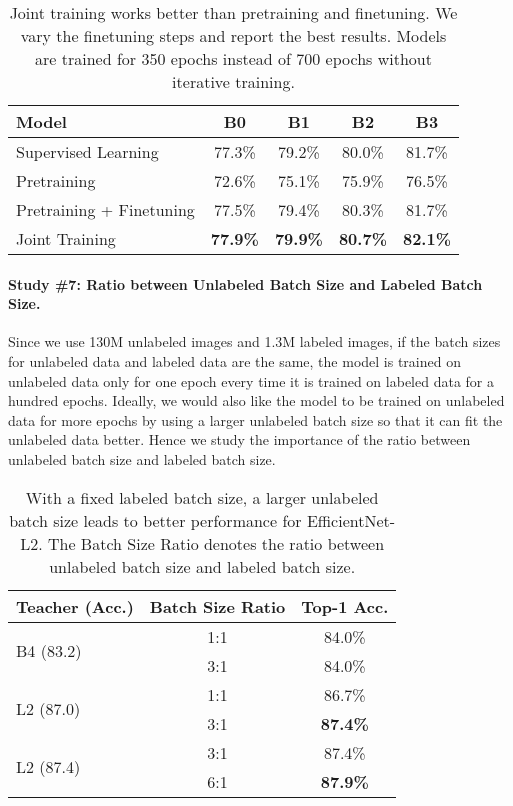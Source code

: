 \documentclass[10pt,twocolumn,letterpaper]{article}
\begin{document}
\begin{table}[h!]
\footnotesize
    \centering
        \begin{tabular}{l|cccc}
        \toprule 
        Model &  B0 & B1 & B2 & B3  \\
        \midrule      
	    Supervised Learning  & 77.3\% & 79.2\% & 80.0\% & 81.7\% \\
	    \midrule
		Pretraining              & 72.6\% & 75.1\% & 75.9\% & 76.5\% \\
		Pretraining + Finetuning & 77.5\% & 79.4\% & 80.3\% & 81.7\% \\
		Joint Training           & \bf 77.9\% & \bf 79.9\% & \bf 80.7\% & \bf 82.1\% \\
        \bottomrule
        \end{tabular}
    \caption{Joint training works better than pretraining and finetuning.  We vary the finetuning steps and report the best results. Models are trained for 350 epochs instead of 700 epochs without iterative training. }
    \label{tab:abl_joint_training}
\end{table}


\paragraph{Study \#7: Ratio between Unlabeled Batch Size and Labeled Batch Size.} 
Since we use 130M unlabeled images and 1.3M labeled images, if  the batch sizes for unlabeled data and labeled data are the same, the model is trained on unlabeled data only for one epoch every time it is trained on labeled data for a hundred epochs. Ideally, we would also like the model to be trained on unlabeled data for more epochs by using a larger unlabeled batch size so that it can fit the unlabeled data better. Hence we study the importance of the ratio between unlabeled batch size and labeled batch size. 


\begin{table}[h!]
\footnotesize
    \centering
        \begin{tabular}{l|cc}
        \toprule 
         Teacher (Acc.) & Batch Size Ratio  & Top-1 Acc.  \\
        \midrule      
        \multirow{2}{*}{B4 (83.2)} & 1:1 & 84.0\% \\
	     & 3:1 & 84.0\% \\
	     \midrule      
	    \multirow{2}{*}{L2 (87.0)} & 1:1 & 86.7\% \\
	     & 3:1 & \bf 87.4\% \\
	    \midrule
	    \multirow{2}{*}{L2 (87.4)} & 3:1 & 87.4\% \\
	     & 6:1 & \bf 87.9\% \\
        \bottomrule
        \end{tabular}
    \caption{With a fixed labeled batch size, a larger unlabeled batch size leads to better performance for EfficientNet-L2. The Batch Size Ratio denotes the ratio between unlabeled batch size and labeled batch size.}
    \label{tab:abl_unlabeled_ratio}
\end{table}
\end{document}
